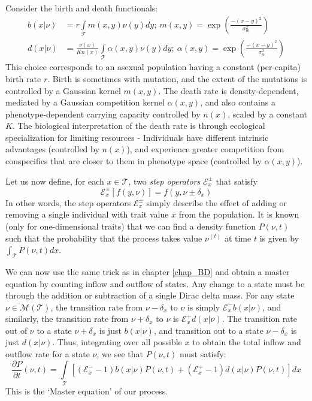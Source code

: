 \begin{example}
Consider the birth and death functionals:
\begin{equation}
\label{Rogers_logistic_BD}
\begin{aligned}
b(x|\nu) &= r\int\limits_{\mathcal{T}}m(x,y)\nu(y)dy; \ m(x,y) = \exp\left(\frac{-(x-y)^2}{\sigma_{m}^{2}}\right)\\
    d(x|\nu) &= \frac{\nu(x)}{Kn(x)}\int\limits_{\mathcal{T}}\alpha(x,y)\nu(y)dy; \ \alpha(x,y) = \exp\left(\frac{-(x-y)^2}{\sigma_{\alpha}^{2}}\right)
\end{aligned}
\end{equation}
This choice corresponds to an asexual population having a constant (per-capita) birth rate $r$. Birth is sometimes with mutation, and the extent of the mutations is controlled by a Gaussian kernel $m(x,y)$. The death rate is density-dependent, mediated by a Gaussian competition kernel $\alpha(x,y)$, and also contains a phenotype-dependent carrying capacity controlled by $n(x)$, scaled by a constant $K$. The biological interpretation of the death rate is through ecological specialization for limiting resources - Individuals have different intrinsic advantages (controlled by $n(x)$), and experience greater competition from conspecifics that are closer to them in phenotype space (controlled by $\alpha(x,y)$).
\end{example}
Let us now define, for each $x \in \mathcal{T}$, two \emph{step operators} $\mathcal{E}_{x}^{\pm}$ that satisfy
\begin{equation*}
    \mathcal{E}_{x}^{\pm}[f(y,\nu)] =  f(y,\nu \pm \delta_x)
\end{equation*}
In other words, the step operators $\mathcal{E}_{x}^{\pm}$ simply describe the effect of adding or removing a single individual with trait value $x$ from the population.
It is known (only for one-dimensional traits) that we can find a density function $P(\nu,t)$ such that the probability that the process takes value $\nu^{(t)}$ at time $t$ is given by $\int_{\mathcal{T}}P(\nu,t)dx$.

We can now use the same trick as in chapter \ref{chap_BD} and obtain a master equation by counting inflow and outflow of states. Any change to a state must be through the addition or subtraction of a single Dirac delta mass. For any state $\nu \in \mathcal{M}(\mathcal{T})$, the transition rate from $\nu - \delta_{x}$ to $\nu$ is simply $\mathcal{E}^{-}_{x}b(x|\nu)$, and similarly, the transition rate from $\nu+\delta_{x}$ to $\nu$ is $\mathcal{E}^{+}_{x}d(x|\nu)$. The transition rate out of $\nu$ to a state $\nu+\delta_x$ is just $b(x|\nu)$, and transition out to a state $\nu - \delta_x$ is just $d(x|\nu)$. Thus, integrating over all possible $x$ to obtain the total inflow and outflow rate for a state $\nu$, we see that $P(\nu,t)$ must satisfy:
\begin{equation}
\label{unnormalized_M_equation}
    \frac{\partial P}{\partial t}(\nu,t) = \int\limits_{\mathcal{T}}\left[(\mathcal{E}^{-}_{x}-1)b(x|\nu)P(\nu,t) + (\mathcal{E}^{+}_{x}-1)d(x|\nu)P(\nu,t)\right]dx
\end{equation}
This is the `Master equation' of our process.

